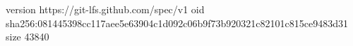 version https://git-lfs.github.com/spec/v1
oid sha256:081445398cc117aee5e63904c1d092c06b9f73b920321c82101c815ce9483d31
size 43840
